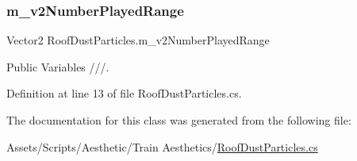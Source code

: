 \subsubsection{\texorpdfstring{m\+\_\+v2\+Number\+Played\+Range}{m\_v2NumberPlayedRange}}
{\footnotesize\ttfamily Vector2 Roof\+Dust\+Particles.\+m\+\_\+v2\+Number\+Played\+Range}



Public Variables ///. 



Definition at line 13 of file Roof\+Dust\+Particles.\+cs.



The documentation for this class was generated from the following file\+:\begin{DoxyCompactItemize}
\item 
Assets/\+Scripts/\+Aesthetic/\+Train Aesthetics/\mbox{\hyperlink{_roof_dust_particles_8cs}{Roof\+Dust\+Particles.\+cs}}\end{DoxyCompactItemize}
